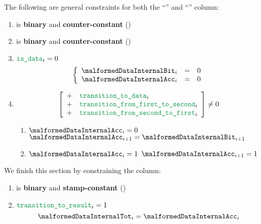 The following are general constraints for both the ``'' and ``'' column:
\begin{enumerate}
    \item \malformedDataInternalBit{} is \textbf{binary} and \textbf{counter-constant} \quad (\trash)
    \item \malformedDataInternalAcc{} is \textbf{binary} and \textbf{counter-constant} \quad (\trash)
    \item \If $\locIsData _{i} = 0$ \Then
        \[
            \left\{ \begin{array}{lclr}
                \malformedDataInternalBit _{i} & = & 0 \\
                \malformedDataInternalAcc _{i} & = & 0 \\
            \end{array} \right.
        \]
    \item \If
        \[
            \left[ \begin{array}{cl}
                + & \locTransitionToData            _{i} \\
                + & \locTransitionFromFirstToSecond _{i} \\
                + & \locTransitionFromSecondToFirst _{i} \\
            \end{array} \right]
            \neq 0
        \]
        \Then
        \begin{enumerate}
            \item \If $\malformedDataInternalAcc _{i} = 0$ \Then $\malformedDataInternalAcc _{i+1} = \malformedDataInternalBit_ {i+1}$
            \item \If $\malformedDataInternalAcc _{i} = 1$ \Then $\malformedDataInternalAcc _{i+1} = 1$
        \end{enumerate}
\end{enumerate}
We finish this section by constraining the \malformedDataInternalTot{} column:
\begin{enumerate}[resume]
    \item \malformedDataInternalTot{} is \textbf{binary} and \textbf{stamp-constant} \quad (\trash)
    \item \If $\locTransitionToResult _{i} = 1$ \Then
        \[
            \malformedDataInternalTot _{i} = \malformedDataInternalAcc _{i}
        \]
\end{enumerate}
